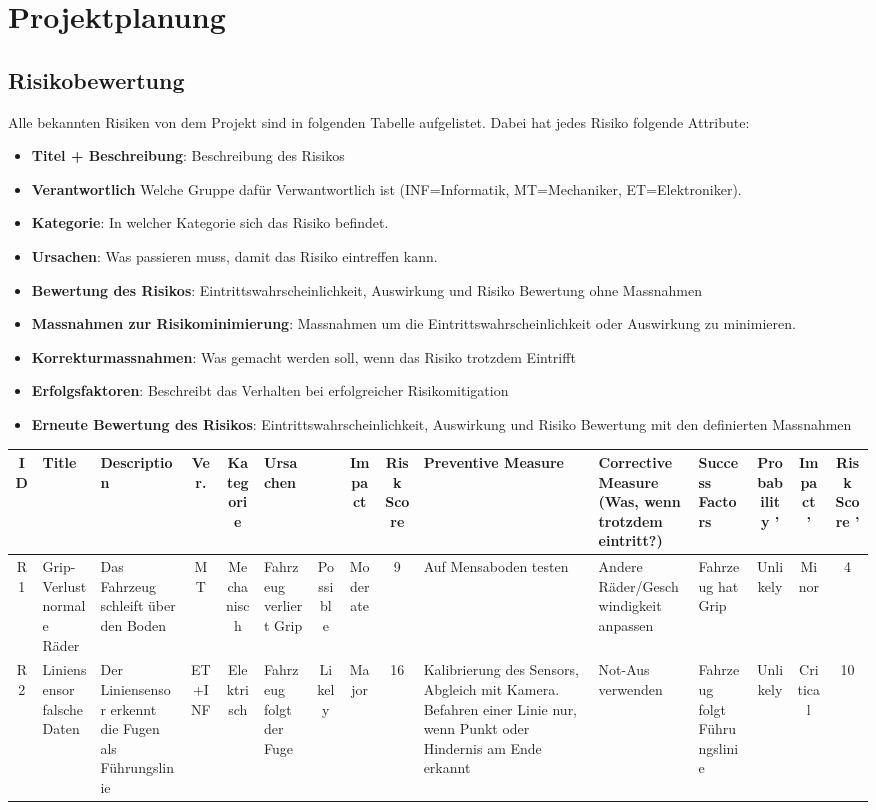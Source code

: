 \newpage
\section{Projektplanung}

\subsection{Risikobewertung}

Alle bekannten Risiken von dem Projekt sind in folgenden Tabelle aufgelistet.
Dabei hat jedes Risiko folgende Attribute:
\begin{itemize}
    \item \textbf{Titel + Beschreibung}: Beschreibung des Risikos
    \item \textbf{Verantwortlich} Welche Gruppe dafür Verwantwortlich ist (INF=Informatik, MT=Mechaniker, ET=Elektroniker).
    \item \textbf{Kategorie}: In welcher Kategorie sich das Risiko befindet.
    \item \textbf{Ursachen}: Was passieren muss, damit das Risiko eintreffen kann.
    \item \textbf{Bewertung des Risikos}: Eintrittswahrscheinlichkeit, Auswirkung und Risiko Bewertung ohne Massnahmen
    \item \textbf{Massnahmen zur Risikominimierung}: Massnahmen um die Eintrittswahrscheinlichkeit oder Auswirkung zu minimieren.
    \item \textbf{Korrekturmassnahmen}: Was gemacht werden soll, wenn das Risiko trotzdem Eintrifft
    \item \textbf{Erfolgsfaktoren}: Beschreibt das Verhalten bei erfolgreicher Risikomitigation
    \item \textbf{Erneute Bewertung des Risikos}: Eintrittswahrscheinlichkeit, Auswirkung und Risiko Bewertung mit den definierten Massnahmen
\end{itemize}
\begin{landscape}
\scriptsize
\begin{longtable}{|c|p{4cm}|p{4cm}|c|c|p{4cm}|c|c|c|p{4cm}|p{4cm}|p{4cm}|c|c|c|}
\hline
ID & Title & Description & Ver. & Kategorie & Ursachen &  & Impact & Risk Score & Preventive Measure & Corrective Measure (Was, wenn trotzdem eintritt?) & Success Factors & Probability ' & Impact ' & Risk Score ' \\
\hline
R1 & Grip-Verlust normale Räder & Das Fahrzeug schleift über den Boden & MT & Mechanisch & Fahrzeug verliert Grip & Possible & Moderate & 9 & Auf Mensaboden testen & Andere Räder/Geschwindigkeit anpassen & Fahrzeug hat Grip & Unlikely & Minor & 4 \\
\hline
R2 & Liniensensor falsche Daten & Der Liniensensor erkennt die Fugen als Führungslinie & ET+INF & Elektrisch & Fahrzeug folgt der Fuge & Likely & Major & 16 & Kalibrierung des Sensors, Abgleich mit Kamera. Befahren einer Linie nur, wenn Punkt oder Hindernis am Ende erkannt & Not-Aus verwenden & Fahrzeug folgt Führungslinie & Unlikely & Critical & 10 \\
\hline
\end{longtable}
\normalsize
\end{landscape}


